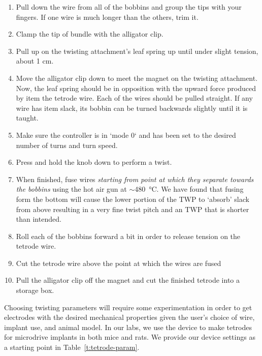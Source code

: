 \documentclass[11pt,a4paper]{article}
\begin{document}
\begin{enumerate}[noitemsep]
    \item Pull down the wire from all of the bobbins and group the tips with
        your fingers. If one wire is much longer than the others, trim it.
    \item Clamp the tip of bundle with the alligator clip.
    \item Pull up on the twisting attachment's leaf spring up until under
        slight tension, about 1 cm.
    \item Move the alligator clip down to meet the magnet on the twisting attachment.
        Now, the leaf spring should be in opposition with the upward force
        produced by item the tetrode wire. Each of the wires should be pulled
        straight. If any wire has item slack, its bobbin can be turned
        backwards slightly until it is taught.
    \item Make sure the controller is in `mode 0` and has been set to the
        desired number of turns and turn speed.
    \item Press and hold the knob down to perform a twist.
    \item When finished, fuse wires \textit{starting from point at which
        they separate towards the bobbins} using the hot air gun at
        $\sim$\SI{480}{\celsius}. We have found that fusing form the bottom will cause
        the lower portion of the TWP to `absorb' slack from above resulting in
        a very fine twist pitch and an TWP that is shorter than intended.
    \item Roll each of the bobbins forward a bit in order to release tension
        on the tetrode wire.
    \item Cut the tetrode wire above the point at which the wires are fused
    \item Pull the alligator clip off the magnet and cut the finished
        tetrode into a storage box.
\end{enumerate}

Choosing twisting parameters will require some experimentation in order to get
electrodes with the desired mechanical properties given the user's choice of
wire, implant use, and animal model. In our labs, we use the device to make
tetrodes for microdrive implants in both mice and rats. We provide our device
settings as a starting point in Table~\ref{t:tetrode-param}.
\end{document}
